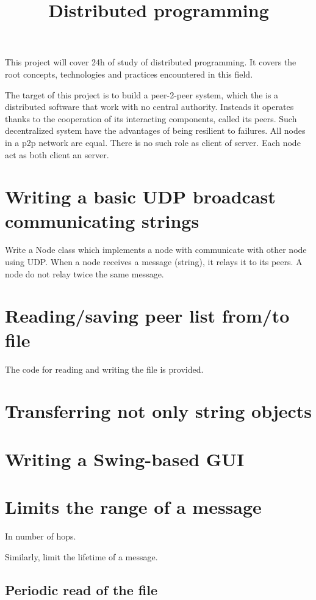 \documentclass[11pt,a4paper]{article}
\title{Distributed programming}
\begin{document}
This project will cover 24h of study of distributed programming. It covers the root concepts, technologies and practices encountered in this field.

The target of this project is to build a peer-2-peer system, which the is a distributed software that work with no central authority. Insteads it operates thanks to the cooperation of its interacting components, called its peers.
Such decentralized system have the advantages of being resilient to failures.
All nodes in a p2p network are equal. There is no such role as client of server. Each node act as both client an server.

\section{Writing a basic UDP broadcast communicating strings}

Write a Node class which implements a node with communicate with other node using UDP. When a node receives a message (string), it relays it to its peers. A node do not relay twice the same message.

\section{Reading/saving peer list from/to file}
The code for reading and writing the file is provided.

\section{Transferring not only string objects}

\section{Writing a Swing-based GUI}

\section{Limits the range of a message}
In number of hops.

Similarly, limit the lifetime of a message.

\subsection{Periodic read of the file}
\end{document}
